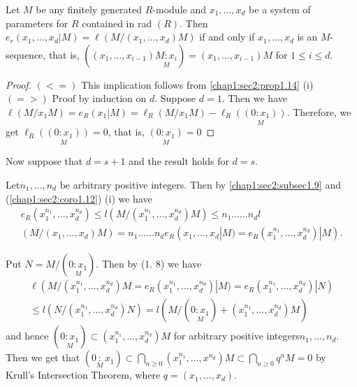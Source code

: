 \setcounter{proposition}{13}
\begin{proposition}\label{chap1:sec2:prop1.14}
  Let $M$ be any finitely generated $R$-module and $x_1, \ldots,
  x_d$ be a system of parameters for $R$ contained in rad $(R)$. Then
  $e_r(x_1, \ldots, x_d|M)= \ell (M/(x_1, \ldots,  x_d)M)$ if and only
  if $x_1, \ldots,  x_d$ is an $M$-sequence, that is, $((x_1, \ldots,
  x_{i-1}) \underset{M}{M:x_i}) = (x_1, \ldots,  x_{i-1})M$ for $1
  \leq i \leq d$. 
\end{proposition}

 \begin{proof}
   $(< =)$ This implication follows from \ref{chap1:sec2:prop1.14}
   (i)~ $(=>)$ Proof by 
   induction on $d$. Suppose $d=1$. Then we have $\ell(M/x_1M) =
   e_R(x_1|M)= \ell_R(M/x_1 M)-\ell_R \underset{M}{((0:x_1))}$.
   Therefore, we get $\ell_R \underset{M}{((0:x_1))}=0$, that is,
   $\underset{M}{(0 : x_1)}=0$  
 \end{proof} 

Now suppose that $d=s+1$ and the result holds for $d=s$.
 
Let\pageoriginale $n_1, \ldots,  n_d$ be arbitrary positive integers.  Then by
\ref{chap1:sec2:subsec1.9} and (\ref{chap1:sec2:coro1.12}) (i) we have 
{\fontsize{10pt}{12pt}\selectfont
\begin{multline*}
  e_R(x^{n_1}_1, \ldots,  x^{n_d}_d)
  \leq l (M/(x^{n_1}_1, \ldots,  x^{n_d}_d)M)\leq n_1 \ldots \ldots n_d
  l\\ 
  (M/(x_1, \ldots, x_d)M) 
  = n_1 \ldots\ldots n_d e_R(x_1, \ldots,
  x_d|M)=e_R(x^{n_1}_1, \ldots, x^{n_d}_d)|M).  
\end{multline*}}\relax

Put $N=M/( \underset {M}{0: x_1})$. Then by (1. 8) we have 
{\fontsize{10pt}{12pt}\selectfont
\begin{multline*}
  \ell(M/(x^{n_1}_1, \ldots,  x^{n_d}_d)M = e_R(x^{n_1}_1, \ldots,
  x^{n_d}_d)|M) =e_R(x^{n_1}_1, \ldots,  x^{n_d}_d)|N)\\
  \leq l
  (N/(x^{n_1}_1, \ldots,  x^{n_d}_d)N)= l(M/( \underset {M}{0: x_1}
  )+(x^{n_1}_1, \ldots,  x^{n_d}_d)M)
\end{multline*}}\relax
and hence $( \underset {M}{0: x_1} )\subset (x^{n_1}_1, \ldots,
x^{n_d}_d)M$ for arbitrary positive integers\break $n_1, \ldots,  n_d$. Then
we get that $(0 \underset {M}: x_1 )\subset \bigcap \limits_{n \geq
  0}(x^{n_1}_1, \ldots,  x^{n_d})M \subset \bigcap \limits_{n \geq 0}
q^n M=0$ by Krull's Intersection Theorem, where $q=(x_1,  \ldots,
x_d)$.  

